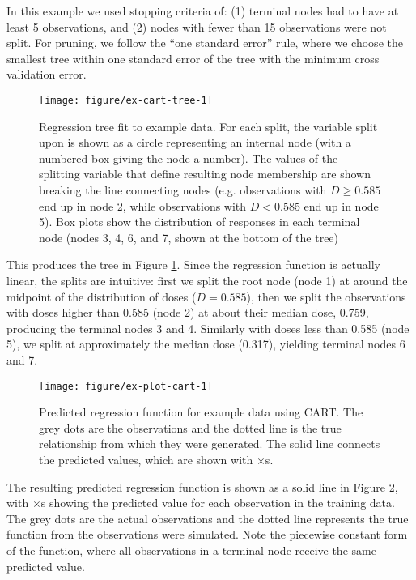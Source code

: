 \documentclass[12pt]{article}
\begin{document}
In this example we used stopping criteria of: (1) terminal nodes had to have at least 5 observations, and (2) nodes with fewer than 15 observations were not split. For pruning, we follow the ``one standard error'' rule, where we choose the smallest tree within one standard error of the tree with the minimum cross validation error.

\begin{figure}[!htbp]
\centering
  \texttt{[image: figure/ex-cart-tree-1]}

\caption[Regression tree fit to example data]{Regression tree fit to example data. For each split, the variable split upon is shown as a circle representing an internal node (with a numbered box giving the node a number). The values of the splitting variable that define resulting node membership are shown breaking the line connecting nodes (e.g. observations with $D \geq 0.585$ end up in node 2, while observations with $D < 0.585$ end up in node 5). Box plots show the distribution of responses in each terminal node (nodes 3, 4, 6, and 7, shown at the bottom of the tree)}\label{fig:ex-cart-tree}
\end{figure}

This produces the tree in Figure \ref{fig:ex-cart-tree}. Since the regression function is actually linear, the splits are intuitive: first we split the root node (node 1) at around the midpoint of the distribution of doses ($D = 0.585$), then we split the observations with doses higher than 0.585 (node 2) at about their median dose, 0.759, producing the terminal nodes 3 and 4. Similarly with doses less than 0.585 (node 5), we split at approximately the median dose (0.317), yielding terminal nodes 6 and 7.

\begin{figure}[!htbp]
\centering
  \texttt{[image: figure/ex-plot-cart-1]}

\caption[Predicted regression function for example data using CART]{Predicted regression function for example data using CART. The grey dots are the observations and the dotted line is the true relationship from which they were generated. The solid line connects the predicted values, which are shown with $\times$s.}\label{fig:ex-plot-cart}
\end{figure}

The resulting predicted regression function is shown as a solid line in Figure \ref{fig:ex-plot-cart}, with $\times$s showing the predicted value for each observation in the training data. The grey dots are the actual observations and the dotted line represents the true function from the observations were simulated. Note the piecewise constant form of the function, where all observations in a terminal node receive the same predicted value.
\end{document}
